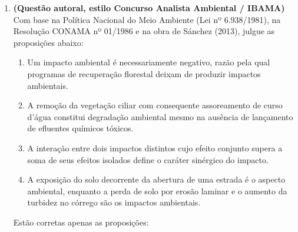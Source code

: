 \begin{enumerate}[leftmargin=1.8em, itemsep=5pt, start=16]
  \item \textbf{(Questão autoral, estilo Concurso Analista Ambiental / IBAMA)} Com base na Política Nacional do Meio Ambiente (Lei nº 6.938/1981), na Resolução CONAMA nº 01/1986 e na obra de Sánchez (2013), julgue as proposições abaixo:
  \begin{enumerate}[label=\Roman*., leftmargin=2.0em, itemsep=2pt]
    \item Um impacto ambiental é necessariamente negativo, razão pela qual programas de recuperação florestal deixam de produzir impactos ambientais.
    \item A remoção da vegetação ciliar com consequente assoreamento de curso d'água constitui degradação ambiental mesmo na ausência de lançamento de efluentes químicos tóxicos.
    \item A interação entre dois impactos distintos cujo efeito conjunto supera a soma de seus efeitos isolados define o caráter sinérgico do impacto.
    \item A exposição do solo decorrente da abertura de uma estrada é o aspecto ambiental, enquanto a perda de solo por erosão laminar e o aumento da turbidez no córrego são os impactos ambientais.
  \end{enumerate}
  Estão corretas apenas as proposições:
  \espacoResolucao[1.3cm]


\end{enumerate}
